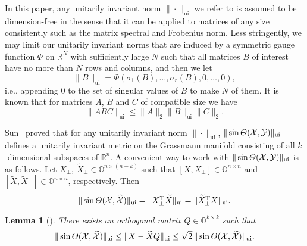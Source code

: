 \documentclass[11pt]{article}
\def\bbO{\mathbb{O}}
\def\bbR{\mathbb{R}}
\def\cX{{\cal X}}
\DeclareMathOperator{\F}{F}
\DeclareMathOperator{\T}{T}
\DeclareMathOperator{\UI}{ui}
\def\wtd{\widetilde}
\newtheorem{lemma}{Lemma}[section]
\theoremstyle{definition}
\numberwithin{equation}{section}
\numberwithin{figure}{section}
\numberwithin{table}{section}
\begin{document}
In this paper, any unitarily invariant norm $\|\cdot\|_{\UI}$ \cite{stsu:1990} we refer to is assumed to be dimension-free in the sense
that it can be applied to matrices of any size consistently such as the matrix spectral and Frobenius norm.
Less stringently, we may limit our unitarily invariant norms that are induced by
a symmetric gauge function $\Phi$ on $\bbR^N$ \cite[section~II.4]{stsu:1990} with sufficiently large $N$ such that
all matrices $B$ of interest have no more than $N$ rows and columns, and then
we let \cite[p.79]{stsu:1990}
$$
\|B\|_{\UI}=\Phi(\sigma_1(B),\ldots,\sigma_r(B), 0,\ldots,0),
$$
i.e., appending $0$ to the set of singular values of $B$ to make $N$ of them.
It is known that for matrices $A$, $B$ and $C$ of compatible size
we have
\begin{equation}\label{eq:UI-2:consistent}
\|ABC\|_{\UI}\le\|A\|_2\|B\|_{\UI}\|C\|_2.
\end{equation}

Sun~\cite[p.95]{sun:1987} proved that for
any unitarily invariant norm $\|\cdot\|_{\UI}$,
$\|\sin\Theta(\cX,{\cal Y})\|_{\UI}$
defines a unitarily invariant metric on the Grassmann manifold
consisting of all $k$-dimensional subspaces
of $\bbR^n$. A convenient way to work with $\|\sin\Theta(\cX,{\cal Y})\|_{\UI}$ is as follows.
Let $X_{\perp},\,\wtd X_{\perp}\in\bbO^{n\times (n-k)}$
such that $[X, X_{\perp}]\in\bbO^{n\times n}$ and $[\wtd X, \wtd X_{\perp}]\in\bbO^{n\times n}$, respectively. Then
\begin{equation}\label{eq:def-comp-sin}
\|\sin\Theta(\cX,\wtd\cX)\|_{\UI}=\|X_{\perp}^{\T}\wtd X\|_{\UI}
=\|\wtd X_{\perp}^{\T}X\|_{\UI}.
\end{equation}



\begin{lemma}[{\cite[Lemma~4.1]{zhli:2014b}}]\label{le:max-angle}
There exists an orthogonal matrix $Q\in\bbO^{k\times k}$ such that
\begin{equation}\label{eq:angle1}
    \|\sin\Theta(\cX,\wtd\cX)\|_{\UI}\le\|X-\wtd XQ\|_{\UI}\le\sqrt 2\,\|\sin\Theta(\cX,\wtd\cX)\|_{\UI}.
\end{equation}
\end{lemma}
\end{document}
